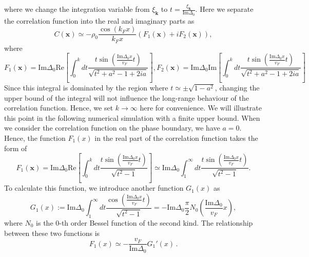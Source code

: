 \documentclass[aps,onecolumn,nofootinbib,superscriptaddress,notitlepage,longbibliography]{revtex4-1}
\begin{document}
where we change the integration variable from $\xi_{\bm{k}}$ to $t=\frac{\xi_{\bm{k}}}{\text{Im}\Delta_0} $. Here we separate the correlation function into the real and imaginary parts as 
\begin{equation}
	C(\bm{x})\simeq-\rho_0 \frac{\cos(k_F x)}{k_Fx}(F_1(\bm{x})+iF_2(\bm{x})),
\end{equation}
where
\begin{equation}
	F_1(\bm{x})=\text{Im}\Delta_0\text{Re}\left[\int_0^{k} dt \frac{t\sin ( \frac{\text{Im}\Delta_0x}{v_F}
	t )}{ \sqrt{t^2 +a^2- 1+2ia}}\right],F_2(\bm{x})=\text{Im}\Delta_0\text{Im}\left[\int_0^{k} dt \frac{t\sin ( \frac{\text{Im}\Delta_0x}{v_F}
	t )}{ \sqrt{t^2 +a^2- 1+2ia}}\right]\label{F_1F_2}
\end{equation}
 Since this integral is dominated by the region where $t\simeq\pm\sqrt{1-a^2}$, changing the upper bound of the integral will not influence the long-range behaviour of the correlation function. Hence, we set $k\to\infty$ here for convenience. We will illustrate this point in the following numerical simulation with a finite upper bound.
 When we consider the correlation function on the phase boundary, we have $a=0$. Hence, the function $F_1(x)$ in the real part of the correlation function takes the form of
\begin{equation}
	F_1(\bm{x})=\text{Im}\Delta_0\text{Re}\left[\int_0^{k} dt \frac{t\sin ( \frac{\text{Im}\Delta_0x}{v_F}
	t )}{ \sqrt{t^2 - 1}}\right]\simeq\text{Im}\Delta_0\int_1^{\infty} dt \frac{t\sin ( \frac{\text{Im}\Delta_0x}{v_F}
	t )}{ \sqrt{t^2 - 1}}.
	\label{definition_of_F1}
\end{equation}
To calculate this function, we introduce another function $G_1(x)$ as
\begin{equation}
	G_1 (x) := \text{Im}
		\Delta_0\int_1^{\infty} dt \frac{\cos ( \frac{\text{Im}\Delta_0x}{v_F}
		t )}{ \sqrt{t^2 - 1}}=-\text{Im}\Delta_0\frac{\pi}{2} N_0 \left( \frac{\text{Im} \Delta_0}{v_F} x \right),
\end{equation}
where $N_0$ is the 0-th order Bessel function of the second kind. The relationship between these two functions is 
\begin{equation}
	F_1 (x) \simeq - \frac{v_F}{\text{Im}\Delta_0} G_1' (x)\,.
\end{equation}
\end{document}
